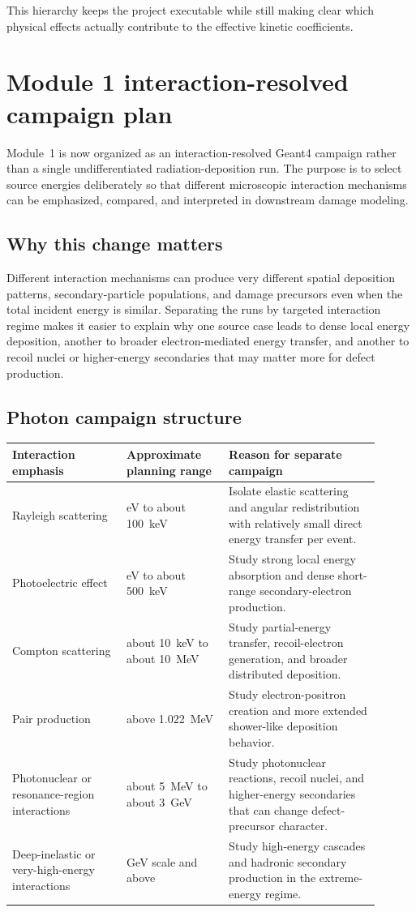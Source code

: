 \documentclass[11pt]{article}
\begin{document}
This hierarchy keeps the project executable while still making clear which physical effects actually contribute to the effective kinetic coefficients.

\section{Module 1 interaction-resolved campaign plan}
Module~1 is now organized as an interaction-resolved Geant4 campaign rather than a single undifferentiated radiation-deposition run. The purpose is to select source energies deliberately so that different microscopic interaction mechanisms can be emphasized, compared, and interpreted in downstream damage modeling.

\subsection{Why this change matters}
Different interaction mechanisms can produce very different spatial deposition patterns, secondary-particle populations, and damage precursors even when the total incident energy is similar. Separating the runs by targeted interaction regime makes it easier to explain why one source case leads to dense local energy deposition, another to broader electron-mediated energy transfer, and another to recoil nuclei or higher-energy secondaries that may matter more for defect production.

\subsection{Photon campaign structure}
\begin{longtable}{p{0.28\linewidth} p{0.25\linewidth} p{0.37\linewidth}}
\toprule
\textbf{Interaction emphasis} & \textbf{Approximate planning range} & \textbf{Reason for separate campaign}\\
\midrule
Rayleigh scattering & eV to about 100~keV & Isolate elastic scattering and angular redistribution with relatively small direct energy transfer per event.\\
Photoelectric effect & eV to about 500~keV & Study strong local energy absorption and dense short-range secondary-electron production.\\
Compton scattering & about 10~keV to about 10~MeV & Study partial-energy transfer, recoil-electron generation, and broader distributed deposition.\\
Pair production & above 1.022~MeV & Study electron-positron creation and more extended shower-like deposition behavior.\\
Photonuclear or resonance-region interactions & about 5~MeV to about 3~GeV & Study photonuclear reactions, recoil nuclei, and higher-energy secondaries that can change defect-precursor character.\\
Deep-inelastic or very-high-energy interactions & GeV scale and above & Study high-energy cascades and hadronic secondary production in the extreme-energy regime.\\
\bottomrule
\end{longtable}
\end{document}
